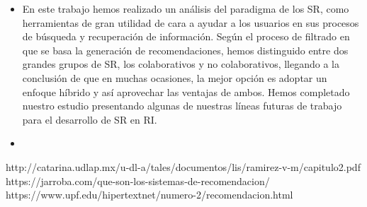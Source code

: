 \begin{itemize}
\item En este trabajo hemos realizado un análisis del paradigma de los SR, como herramientas de gran utilidad de cara a ayudar a los usuarios en sus procesos de búsqueda y recuperación de información. Según el proceso de filtrado en que se basa la generación de recomendaciones, hemos distinguido entre dos grandes grupos de SR, los colaborativos y no colaborativos, llegando a la conclusión de que en muchas ocasiones, la mejor opción es adoptar un enfoque híbrido y así aprovechar las ventajas de ambos. Hemos completado nuestro estudio presentando algunas de nuestras líneas futuras de trabajo para el desarrollo de SR en RI.

\item 


\end{itemize}


\newpage
\begin{thebibliography}{99}


 http://catarina.udlap.mx/u-dl-a/tales/documentos/lis/ramirez-v-m/capitulo2.pdf
 https://jarroba.com/que-son-los-sistemas-de-recomendacion/ 
 https://www.upf.edu/hipertextnet/numero-2/recomendacion.html

\end{thebibliography}


